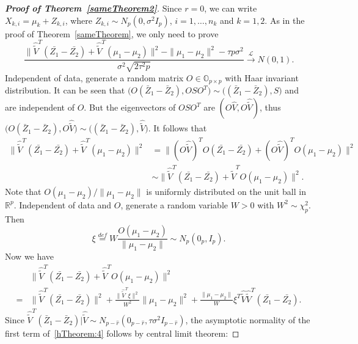 \documentclass[review]{elsarticle}
\theoremstyle{plain}
\theoremstyle{definition}
\theoremstyle{remark}
\begin{document}
\begin{proof}[\textbf{Proof of Theorem~\ref{sameTheorem2}}]
    Since $r=0$, we can write $X_{k,i}=\mu_k+Z_{k,i}$, where $Z_{k,i}\sim N_p(0,\sigma^2 I_p)$, $i=1,\ldots,n_k$ and $k=1,2$.
    As in the proof of Theorem~\ref{sameTheorem}, we only need to prove
    $$
    \frac{\|\hat{\tilde{V}}^T(\bar{Z_1}-\bar{Z_2})+\hat{\tilde{V}}^T(\mu_1-\mu_2)\|^2-\|\mu_1-\mu_2\|^2-\tau p \sigma^2}{\sigma^2\sqrt{2\tau^2 p}}\xrightarrow{\mathcal{L}}N(0,1).
    $$
    Independent of data, generate a random matrix $O\in\mathbb{O}_{p\times p}$ with Haar invariant distribution. It can be seen that
    $
    \big(O(\bar{Z}_1-\bar{Z}_2), OSO^T\big)\sim
    \big((\bar{Z}_1-\bar{Z}_2), S\big)
    $ and are independent of $O$.
    But the eigenvectors of $OSO^T$ are $(O\hat{V},O\hat{\tilde{V}})$, thus
    $
    \big(O(\bar{Z}_1-\bar{Z}_2), O\hat{\tilde{V}}\big)\sim
    \big((\bar{Z}_1-\bar{Z}_2), \hat{\tilde{V}}\big)
    $.
    It follows that
    \begin{equation*}
    \begin{aligned}
\|\hat{\tilde{V}}^T(\bar{Z_1}-\bar{Z_2})+\hat{\tilde{V}}^T(\mu_1-\mu_2)\|^2
        &=
    \|(O\hat{\tilde{V}})^T O(\bar{Z_1}-\bar{Z_2})+(O\hat{\tilde{V}})^T O(\mu_1-\mu_2)\|^2\\
        &\sim
\|\hat{\tilde{V}}^T(\bar{Z_1}-\bar{Z_2})+\hat{\tilde{V}}^T O(\mu_1-\mu_2)\|^2.
\end{aligned}
\end{equation*}
    Note that $O(\mu_1-\mu_2)/\|\mu_1-\mu_2\|$ is uniformly distributed on the unit ball in $\mathbb{R}^p$. Independent of data and $O$, generate a random variable $W>0$ with $W^2\sim\chi^2_p$. Then 
    $$
    \xi \overset{def}{=} W \frac{O(\mu_1-\mu_2)}{\|\mu_1-\mu_2\|}\sim N_p(0_p,I_p).
    $$
Now we have
    \begin{equation}\label{hTheorem:4}
\begin{aligned}
    &\|\hat{\tilde{V}}^T(\bar{Z_1}-\bar{Z_2})+\hat{\tilde{V}}^T O(\mu_1-\mu_2)\|^2\\
    =&
    \|\hat{\tilde{V}}^T(\bar{Z_1}-\bar{Z_2})\|^2+\frac{\|\hat{\tilde{V}}^T\xi\|^2}{W^2}\|\mu_1-\mu_2\|^2+\frac{\|\mu_1-\mu_2\|}{W}\xi^T\hat{\tilde{V}}\hat{\tilde{V}}^T(\bar{Z_1}-\bar{Z_2}).
\end{aligned}
\end{equation}
    Since $\hat{\tilde{V}}^T(\bar{Z}_1-\bar{Z}_2)|\hat{\tilde{V}}\sim N_{p-\hat{r}}(0_{p-\hat{r}},\tau\sigma^2 I_{p-\hat{r}})$, the asymptotic normality of the first term of~\eqref{hTheorem:4} follows by central limit theorem:

\end{proof}
\end{document}
